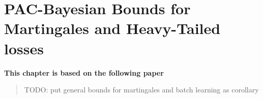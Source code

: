 \chapter{PAC-Bayesian Bounds for Martingales and Heavy-Tailed losses}
\label{chap:pb-supermartingales}

\addchapterlof
\addchapterloa
\addchapterloe

\vspace{-1.5cm}
\begin{center}
\textbf{This chapter is based on the following paper}\\[0.1cm]
\end{center}

\minitoc

\begin{abstract}
TODO: put general bounds for martingales and batch learning as corollary
\end{abstract}

\newpage